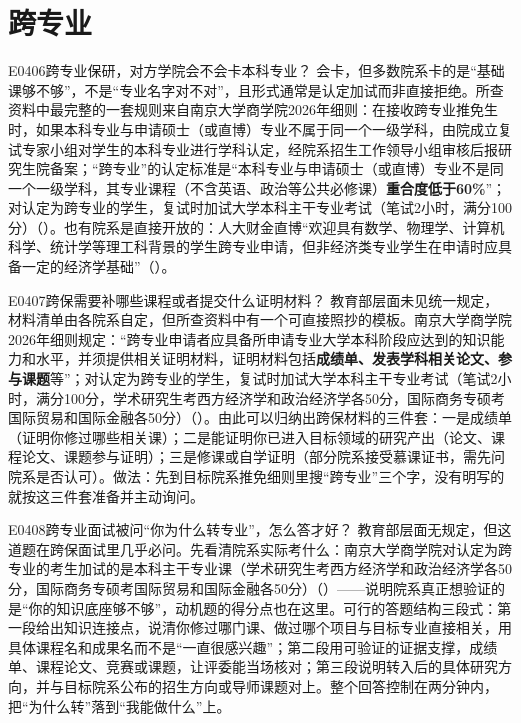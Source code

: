\section{跨专业}
\begin{qa}{E0406}{跨专业保研，对方学院会不会卡本科专业？}
会卡，但多数院系卡的是“基础课够不够”，不是“专业名字对不对”，且形式通常是认定加试而非直接拒绝。所查资料中最完整的一套规则来自南京大学商学院2026年细则：在接收跨专业推免生时，如果本科专业与申请硕士（或直博）专业不属于同一个一级学科，由院成立复试专家小组对学生的本科专业进行学科认定，经院系招生工作领导小组审核后报研究生院备案；“跨专业”的认定标准是“本科专业与申请硕士（或直博）专业不是同一个一级学科，其专业课程（不含英语、政治等公共必修课）\textbf{重合度低于60\%}”；对认定为跨专业的学生，复试时加试大学本科主干专业考试（笔试2小时，满分100分）（）。也有院系是直接开放的：人大财金直博“欢迎具有数学、物理学、计算机科学、统计学等理工科背景的学生跨专业申请，但非经济类专业学生在申请时应具备一定的经济学基础”（）。
\end{qa}

\begin{qa}{E0407}{跨保需要补哪些课程或者提交什么证明材料？}
教育部层面未见统一规定，材料清单由各院系自定，但所查资料中有一个可直接照抄的模板。南京大学商学院2026年细则规定：“跨专业申请者应具备所申请专业大学本科阶段应达到的知识能力和水平，并须提供相关证明材料，证明材料包括\textbf{成绩单、发表学科相关论文、参与课题}等”；对认定为跨专业的学生，复试时加试大学本科主干专业考试（笔试2小时，满分100分，学术研究生考西方经济学和政治经济学各50分，国际商务专硕考国际贸易和国际金融各50分）（）。由此可以归纳出跨保材料的三件套：一是成绩单（证明你修过哪些相关课）；二是能证明你已进入目标领域的研究产出（论文、课程论文、课题参与证明）；三是修课或自学证明（部分院系接受慕课证书，需先问院系是否认可）。做法：先到目标院系推免细则里搜“跨专业”三个字，没有明写的就按这三件套准备并主动询问。
\end{qa}

\begin{qa}{E0408}{跨专业面试被问“你为什么转专业”，怎么答才好？}
教育部层面无规定，但这道题在跨保面试里几乎必问。先看清院系实际考什么：南京大学商学院对认定为跨专业的考生加试的是本科主干专业课（学术研究生考西方经济学和政治经济学各50分，国际商务专硕考国际贸易和国际金融各50分）（）——说明院系真正想验证的是“你的知识底座够不够”，动机题的得分点也在这里。可行的答题结构三段式：第一段给出知识连接点，说清你修过哪门课、做过哪个项目与目标专业直接相关，用具体课程名和成果名而不是“一直很感兴趣”；第二段用可验证的证据支撑，成绩单、课程论文、竞赛或课题，让评委能当场核对；第三段说明转入后的具体研究方向，并与目标院系公布的招生方向或导师课题对上。整个回答控制在两分钟内，把“为什么转”落到“我能做什么”上。
\end{qa}

